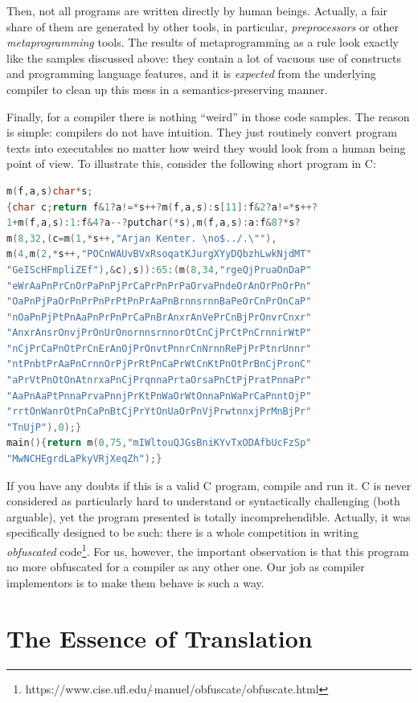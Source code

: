 \documentclass{article}
\begin{document}
Then, not all programs are written directly by human beings. Actually, a fair share of them are generated by other tools, in particular, \emph{preprocessors}
or other \emph{metaprogramming} tools. The results of metaprogramming as a rule look exactly like the samples discussed above: they contain a lot
of vacuous use of constructs and programming language features, and it is \emph{expected} from the underlying compiler to clean up this mess
in a semantics-preserving manner.

Finally, for a compiler there is nothing ``weird'' in those code samples. The reason is simple: compilers do not have intuition. They just 
routinely convert program texts into executables no matter how weird they would look from a human being point of view. To illustrate this,
consider the following short program in \textsc{C}: 

\begin{lstlisting}[language=cc]
m(f,a,s)char*s;
{char c;return f&1?a!=*s++?m(f,a,s):s[11]:f&2?a!=*s++?
1+m(f,a,s):1:f&4?a--?putchar(*s),m(f,a,s):a:f&8?*s?
m(8,32,(c=m(1,*s++,"Arjan Kenter. \no$../.\""),
m(4,m(2,*s++,"POCnWAUvBVxRsoqatKJurgXYyDQbzhLwkNjdMT"
"GeIScHFmpliZEf"),&c),s)):65:(m(8,34,"rgeQjPruaOnDaP"
"eWrAaPnPrCnOrPaPnPjPrCaPrPnPrPaOrvaPndeOrAnOrPnOrPn"
"OaPnPjPaOrPnPrPnPrPtPnPrAaPnBrnnsrnnBaPeOrCnPrOnCaP"
"nOaPnPjPtPnAaPnPrPnPrCaPnBrAnxrAnVePrCnBjPrOnvrCnxr"
"AnxrAnsrOnvjPrOnUrOnornnsrnnorOtCnCjPrCtPnCrnnirWtP"
"nCjPrCaPnOtPrCnErAnOjPrOnvtPnnrCnNrnnRePjPrPtnrUnnr"
"ntPnbtPrAaPnCrnnOrPjPrRtPnCaPrWtCnKtPnOtPrBnCjPronC"
"aPrVtPnOtOnAtnrxaPnCjPrqnnaPrtaOrsaPnCtPjPratPnnaPr"
"AaPnAaPtPnnaPrvaPnnjPrKtPnWaOrWtOnnaPnWaPrCaPnntOjP"
"rrtOnWanrOtPnCaPnBtCjPrYtOnUaOrPnVjPrwtnnxjPrMnBjPr"
"TnUjP"),0);}
main(){return m(0,75,"mIWltouQJGsBniKYvTxODAfbUcFzSp"
"MwNCHEgrdLaPkyVRjXeqZh");}
\end{lstlisting}

If you have any doubts if this is a valid \textsc{C} program, compile and run it. \textsc{C} is never considered as particularly hard to
understand or syntactically challenging (both arguable), yet the program presented is totally incomprehendible. Actually, it
was specifically designed to be such: there is a whole competition in writing \emph{obfuscated}
code\footnote{https://www.cise.ufl.edu/$\tilde\,$manuel/obfuscate/obfuscate.html}. For us, however, the important observation is that this
program no more obfuscated for a compiler as any other one. Our job as compiler implementors is to make them behave is such a way.


\section{The Essence of Translation}
\end{document}
